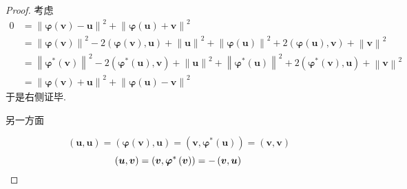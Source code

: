 {\begin{proof}
        考虑\begin{align*}
            0 & =
            \left\lVert\bm{\varphi}\left(\bm{v}\right)-\bm{u}\right\rVert^2+\left\lVert\bm{\varphi}\left(\bm{u}\right)+\bm{v}\right\rVert^2      \\
              & =\left\lVert\bm{\varphi}\left(\bm{v}\right)\right\rVert^2-2\left(
            \bm{\varphi}\left(\bm{v}\right),\bm{u}
            \right)+\left\lVert\bm{u}\right\rVert^2+\left\lVert\bm{\varphi}\left(\bm{u}\right)\right\rVert^2+2\left(
            \bm{\varphi}\left(\bm{u}\right),\bm{v}
            \right)+\left\lVert\bm{v}\right\rVert^2                                                                                              \\
              & =\left\lVert\bm{\varphi}^*\left(\bm{v}\right)\right\rVert^2-2\left(
            \bm{\varphi}^*\left(\bm{u}\right),\bm{v}
            \right)+\left\lVert\bm{u}\right\rVert^2+\left\lVert\bm{\varphi}^*\left(\bm{u}\right)\right\rVert^2+2\left(
            \bm{\varphi}^*\left(\bm{v}\right),\bm{u}
            \right)+\left\lVert\bm{v}\right\rVert^2                                                                                              \\
              & =\left\lVert\bm{\varphi}\left(\bm{v}\right)+\bm{u}\right\rVert^2+\left\lVert\bm{\varphi}\left(\bm{u}\right)-\bm{v}\right\rVert^2
        \end{align*}于是右侧证毕.

        另一方面

        \[
            \left(
            \bm{u},\bm{u}
            \right)=\left(
            \bm{\varphi}\left(
                \bm{v}
                \right),\bm{u}
            \right)=\left(
            \bm{v},\bm{\varphi}^*\left(
                \bm{u}
                \right)
            \right)=\left(
            \bm{v},\bm{v}
            \right)
        \]\[
            \left(
            \bm{u},\bm{v}
            \right)=\left(
            \bm{v},\bm{\varphi}^*\left(
                \bm{v}
                \right)
            \right)=-\left(
            \bm{v},\bm{u}
            \right)\qedhere
        \]
    \end{proof}
}
